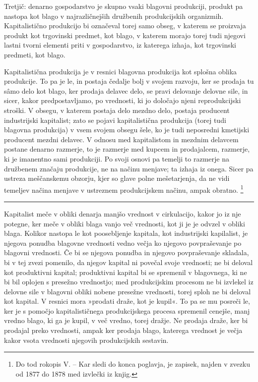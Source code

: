 \documentclass[kapital_02.tex]{subfiles}
\begin{document}
Tretjič: denarno gospodarstvo je skupno vsaki blagovni produkciji, produkt pa nastopa kot blago v najrazličnejših družbenih produkcijskih organizmih. Kapitalistično produkcijo bi označeval torej samo obseg, v katerem se proizvaja produkt kot trgovinski predmet, kot blago, v katerem morajo torej tudi njegovi lastni tvorni elementi priti v gospodarstvo, iz katerega izhaja, kot trgovinski predmeti, kot blago.

Kapitalistična produkcija je v resnici blagovna produkcija kot splošna oblika produkcije. To pa je le, in postaja čedalje bolj v svojem razvoju, ker se prodaja tu s\^amo delo kot blago, ker prodaja delavec delo, se pravi delovanje delovne sile, in sicer, kakor predpostavljamo, po vrednosti, ki \KPEstran jo določajo njeni reprodukcijski stroški. V obsegu, v katerem postaja delo mezdno delo, postaja producent industrijski kapitalist; zato se pojavi kapitalistična produkcija (torej tudi blagovna produkcija) v vsem svojem obsegu šele, ko je tudi neposredni kmetijski producent mezdni delavec. V odnosu med kapitalistom in mezdnim delavcem postane denarno razmerje, to je razmerje med kupcem in prodajalcem, razmerje, ki je imanentno sami produkciji. Po svoji osnovi pa temelji to razmerje na družbenem značaju produkcije, ne na načinu menjave; ta izhaja iz onega. Sicer pa ustreza meščanskemu obzorju, kjer so glave polne mešetarjenja, da ne vidi temeljev načina menjave v ustreznem produkcijskem načinu, ampak obratno. \footnote{Do tod rokopis V. -- Kar sledi do konca poglavja, je zapisek, najden v zvezku od 1877 do 1878 med izvlečki iz knjig.}
\medskip
\hrule
\medskip

Kapitalist meče v obliki denarja manjšo vrednost v cirkulacijo, kakor jo iz nje potegne, ker meče v obliki blaga vanjo več vrednosti, kot ji je je odvzel v obliki blaga. Kolikor nastopa le kot poosebljenje kapitala, kot industrijski kapilalist, je njegova ponudba blagovne vrednosti vedno večja ko njegovo povpraševanje po blagovni vrednosti. Če bi se njegova ponudba in njegovo povpraševanje skladala, bi v tej zvezi pomenilo, da njegov kapital ni povečal svoje vrednosti; ne bi deloval kot produktivni kapital; produktivni kapital bi se spremenil v blagovnega, ki ne bi bil oplojen s presežno vrednostjo; med produkcijskim procesom ne bi izvlekel iz delovne sile v blagovni obliki nobene presežne vrednosti, torej sploh ne bi deloval kot kapital. V resnici mora »prodati draže, kot je kupil«. To pa se mu posreči le, ker je s pomočjo kapitalističnega produkcijskega procesa spremenil cenejše, manj vredno blago, ki ga je kupil, v več vredno, torej dražje. Ne prodaja draže, ker bi prodajal preko vrednosti, ampak ker prodaja blago, katerega vrednost je večja kakor vsota vrednosti njegovih produkcijskih sestavin.
\end{document}
